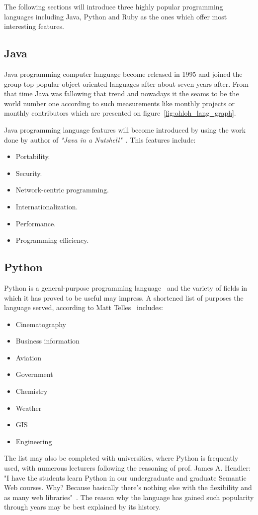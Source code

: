 The following sections will introduce three highly popular programming languages including Java, Python and Ruby as the ones which offer most interesting features. 
\subsection{Java}\label{subsec:java}
Java programming computer language become released in 1995 and joined the group top popular object oriented languages after about seven years after. From that time Java was fallowing that trend and nowadays it the seams to be the world number one according to such measurements like monthly projects or monthly contributors which are presented on figure~\ref{fig:ohloh_lang_graph}.

Java programming language features will become introduced by using the work done by author of \textit{"Java in a Nutshell"}~\cite[pages 4-6]{java_nutshell}. This features include:
\begin{itemize}
\item{Portability.}
\item{Security.}
\item{Network-centric programming.}
\item{Internationalization.}
\item{Performance.}
\item{Programming efficiency.}
\end{itemize}

\subsection{Python}\label{subsec:py}
Python is a general-purpose programming language~\cite[page 3]{py_nutshell} and the variety of fields in which it has proved to be useful may impress. A shortened list of purposes the language served, according to Matt Telles~\cite[page 13]{py_power} includes:
\begin{itemize}
\item{Cinematography}
\item{Business information}
\item{Aviation}
\item{Government}
\item{Chemistry}
\item{Weather}
\item{GIS}
\item{Engineering}
\end{itemize}
The list may also be completed with universities, where Python is frequently used, with numerous lecturers following the reasoning of prof. James A. Hendler: "I have the students learn Python in our undergraduate and graduate Semantic Web courses. Why? Because basically there's nothing else with the flexibility and as many web libraries"~\cite{py_quote}. The reason why the language has gained such popularity through years may be best explained by its history.

